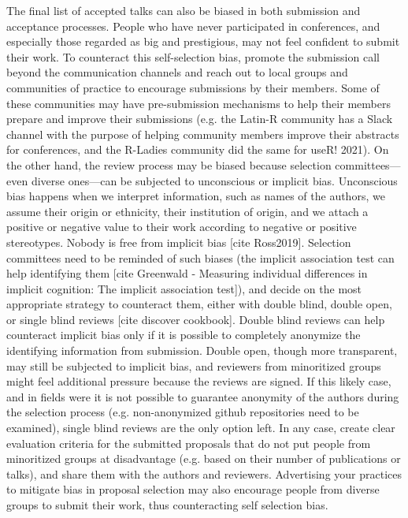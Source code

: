 \documentclass[10pt,letterpaper]{article}
\begin{document}
The final list of accepted talks can also be biased in both submission and acceptance processes. 
People who have never participated in conferences, and especially those regarded as big and prestigious, may not feel confident to submit their work.
To counteract this self-selection bias, promote the submission call beyond the communication channels and reach out to local groups and communities of practice to encourage submissions by their members.
Some of these communities may have pre-submission mechanisms to help their members prepare and improve their submissions (e.g. the Latin-R community has a Slack channel with the purpose of helping community members improve their abstracts for conferences, and the R-Ladies community did the same for useR! 2021).
On the other hand, the review process may be biased because selection committees—even diverse ones—can be subjected to unconscious or implicit bias.
Unconscious bias happens when we interpret information, such as names of the authors, we assume their origin or ethnicity, their institution of origin, and we attach a positive or negative value to their work according to negative or positive stereotypes. Nobody is free from implicit bias [cite Ross2019].
Selection committees need to be reminded of such biases (the implicit association test can help identifying them [cite Greenwald - Measuring individual differences in implicit cognition: The implicit association test]), and
decide on the most appropriate strategy to counteract them, either with double blind, double open, or single blind reviews [cite discover cookbook].
Double blind reviews can help counteract implicit bias only if it is possible to completely anonymize the identifying information from submission. 
Double open, though more transparent, may still be subjected to implicit bias, and reviewers from minoritized groups might feel additional pressure because the reviews are signed. If this likely case, and in fields were it is not possible to guarantee anonymity of the authors during the selection process (e.g.  non-anonymized github repositories need to be examined), single blind reviews are the only option left.  
In any case, create clear evaluation criteria for the submitted proposals that do not put people from minoritized groups at disadvantage (e.g. based on their number of publications or talks), and share them with the authors and reviewers.
Advertising your practices to mitigate bias in proposal selection may also encourage people from diverse groups to submit their work, thus counteracting self selection bias.
\end{document}
